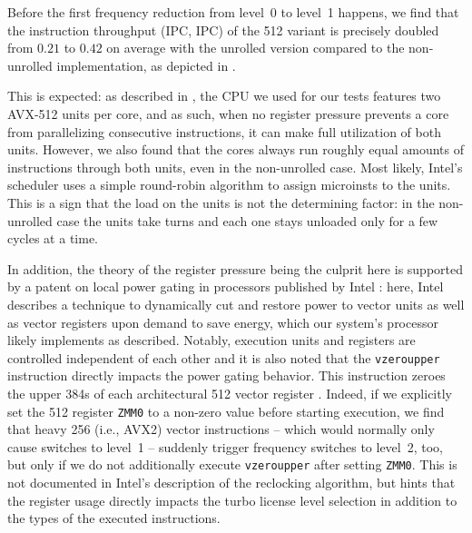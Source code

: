 Before the first frequency reduction from level~0 to level~1 happens, we find that the instruction throughput (\acrlong{IPC}, \acrshort{IPC}) of the \SI[number-unit-product=-]{512}{\bit} variant is precisely doubled from $0.21$ to $0.42$ on average with the unrolled version compared to the non-unrolled implementation, as depicted in .

This is expected: as described in , the \gls{CPU} we used for our tests features two \gls{AVX-512} units per core, and as such, when no register pressure prevents a core from parallelizing consecutive instructions, it can make full utilization of both units. However, we also found that the cores always run roughly equal amounts of instructions through both units, even in the non-unrolled case. Most likely, Intel's scheduler uses a simple round-robin algorithm to assign \glspl{microinst} to the units. This is a sign that the load on the units is not the determining factor: in the non-unrolled case the units take turns and each one stays unloaded only for a few cycles at a time.

In addition, the theory of the register pressure being the culprit here is supported by a patent on local power gating in processors published by Intel \cite{bonen2016performing}: here, Intel describes a technique to dynamically cut and restore power to vector units as well as vector registers upon demand to save energy, which our system's processor likely implements as described. Notably, execution units and registers are controlled independent of each other and it is also noted that the \texttt{vzeroupper} instruction directly impacts the power gating behavior. This instruction zeroes the upper \SI{384}{\bit}s of each architectural \SI[number-unit-product=-]{512}{\bit} vector register \cite{intelsdminstructionreference}. Indeed, if we explicitly set the \SI[number-unit-product=-]{512}{\bit} register \texttt{ZMM0} to a non-zero value before starting execution, we find that heavy \SI[number-unit-product=-]{256}{\bit} (i.e., \gls{AVX2}) vector instructions -- which would normally only cause switches to level~1 -- suddenly trigger frequency switches to level~2, too, but only if we do not additionally execute \texttt{vzeroupper} after setting \texttt{ZMM0}. This is not documented in Intel's description of the reclocking algorithm, but hints that the register usage directly impacts the turbo license level selection in addition to the types of the executed instructions.

